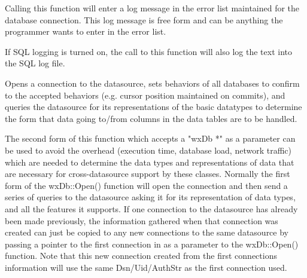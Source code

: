 

Calling this function will enter a log message in the error list maintained
for the database connection.  This log message is free form and can be
anything the programmer wants to enter in the error list.

If SQL logging is turned on, the call to this function will also log the
text into the SQL log file.




\label{wxdbopen}


Opens a connection to the datasource, sets behaviors of all databases to 
confirm to the accepted behaviors (e.g. cursor position maintained on commits), 
and queries the datasource for its representations of the basic datatypes to 
determine the form that data going to/from columns in the data tables are 
to be handled.

The second form of this function which accepts a "wxDb *" as a parameter 
can be used to avoid the overhead (execution time, database load, network 
traffic) which are needed to determine the data types and representations 
of data that are necessary for cross-datasource support by these classes.  
Normally the first form of the wxDb::Open() function will open the connection 
and then send a series of queries to the datasource asking it for its 
representation of data types, and all the features it supports.  If one 
connection to the datasource has already been made previously, the information 
gathered when that connection was created can just be copied to any new 
connections to the same datasource by passing a pointer to the first 
connection in as a parameter to the wxDb::Open() function.  Note that this 
new connection created from the first connections information will use the 
same Dsn/Uid/AuthStr as the first connection used.



